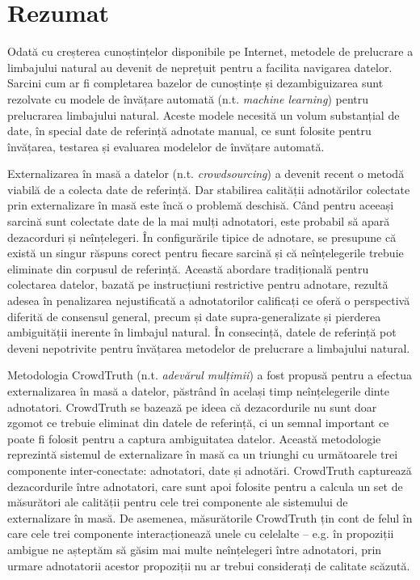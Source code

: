 \manualmark
{}

\chapter*{Rezumat}

Odată cu creșterea cunoștințelor disponibile pe Internet, metodele de prelucrare a limbajului natural au devenit de neprețuit pentru a facilita navigarea datelor. Sarcini cum ar fi completarea bazelor de cunoștințe și dezambiguizarea sunt rezolvate cu modele de învățare automată (n.t. \textit{machine learning}) pentru prelucrarea limbajului natural. Aceste modele necesită un volum substanțial de date, în special date de referință adnotate manual, ce sunt folosite pentru învățarea, testarea și evaluarea modelelor de învățare automată.

Externalizarea în masă a datelor (n.t. \textit{crowdsourcing}) a devenit recent o metodă viabilă de a colecta date de referință. Dar stabilirea calității adnotărilor colectate prin externalizare în masă este încă o problemă deschisă. Când pentru aceeași sarcină sunt colectate date de la mai mulți adnotatori, este probabil să apară dezacorduri și neînțelegeri. În configurările tipice de adnotare, se presupune că există un singur răspuns corect pentru fiecare sarcină și că neînțelegerile trebuie eliminate din corpusul de referință. Această abordare tradițională pentru colectarea datelor, bazată pe instrucțiuni restrictive pentru adnotare, rezultă adesea în penalizarea nejustificată a adnotatorilor calificați ce oferă o perspectivă diferită de consensul general, precum și date supra-generalizate și pierderea ambiguității inerente în limbajul natural. În consecință, datele de referință pot deveni nepotrivite pentru învățarea metodelor de prelucrare a limbajului natural.

Metodologia CrowdTruth (n.t. \textit{adevărul mulțimii}) a fost propusă pentru a efectua externalizarea în masă a datelor, păstrând în același timp neînțelegerile dinte adnotatori. CrowdTruth se bazează pe ideea că dezacordurile nu sunt doar zgomot ce trebuie eliminat din datele de referință, ci un semnal important ce poate fi folosit pentru a captura ambiguitatea datelor. Această metodologie reprezintă sistemul de externalizare în masă ca un triunghi cu următoarele trei componente inter-conectate: adnotatori, date și adnotări. CrowdTruth capturează dezacordurile între adnotatori, care sunt apoi folosite pentru a calcula un set de măsurători ale calității pentru cele trei componente ale sistemului de externalizare în masă. De asemenea, măsurătorile CrowdTruth țin cont de felul în care cele trei componente interacționează unele cu celelalte -- e.g. în propoziții ambigue ne așteptăm să găsim mai multe neînțelegeri între adnotatori, prin urmare adnotatorii acestor propoziții nu ar trebui considerați de calitate scăzută.

